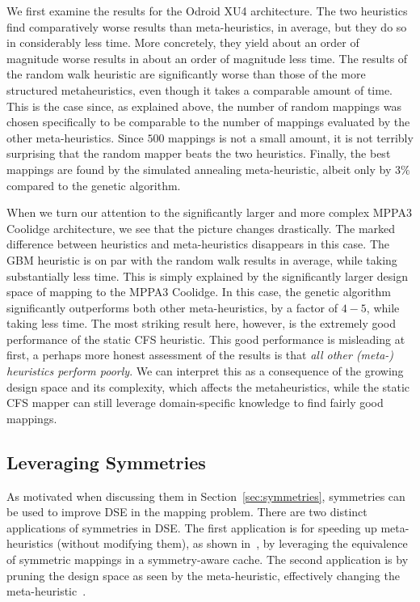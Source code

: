 We first examine the results for the Odroid XU4 architecture.
The two heuristics find comparatively worse results than meta-heuristics, in average, but they do so in considerably less time.
More concretely, they yield about an order of magnitude worse results in about an order of magnitude less time.
The results of the random walk heuristic are significantly worse than those of the more structured metaheuristics, even though it takes a comparable amount of time.
This is the case since, as explained above, the number of random mappings was chosen specifically to be comparable to the number of mappings evaluated by the other meta-heuristics.
Since $500$ mappings is not a small amount, it is not terribly surprising that the random mapper beats the two heuristics.
Finally, the best mappings are found by the simulated annealing meta-heuristic, albeit only by $3\%$ compared to the genetic algorithm.

When we turn our attention to the significantly larger and more complex MPPA3 Coolidge architecture, we see that the picture changes drastically.
The marked difference between heuristics and meta-heuristics disappears in this case.
The \ac{GBM} heuristic is on par with the random walk results in average, while taking substantially less time.
This is simply explained by the significantly larger design space of mapping to the MPPA3 Coolidge.
In this case, the genetic algorithm significantly outperforms both other meta-heuristics, by a factor of $4-5$, while taking less time.
The most striking result here, however, is the extremely good performance of the static CFS heuristic.
This good performance is misleading at first, a perhaps more honest assessment of the results is that \emph{all other (meta-) heuristics perform poorly}.
We can interpret this as a consequence of the growing design space and its complexity, which affects the metaheuristics, while the static CFS mapper can still leverage domain-specific knowledge to find fairly good mappings.


\subsection{Leveraging Symmetries}

As motivated when discussing them in Section~\ref{sec:symmetries}, symmetries can be used to improve \ac{DSE} in the mapping problem.
There are two distinct applications of symmetries in \ac{DSE}.
The first application is for speeding up meta-heuristics (without modifying them), as shown in~\cite{goens_taco17}, by leveraging the equivalence of symmetric mappings in a symmetry-aware cache.
The second application is by pruning the design space as seen by the meta-heuristic, effectively changing the meta-heuristic~\cite{goens_mcsoc18,goens_tcad21}.

